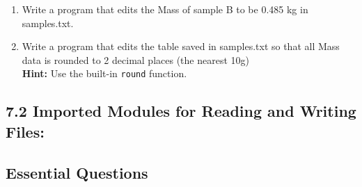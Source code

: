 \documentclass[11pt]{report}
\begin{document}
\begin{enumerate}[label=(\Alph*)]


    \item Write a program that edits the Mass of sample B to be 0.485 kg in samples.txt.
    
    \item Write a program that edits the table saved in samples.txt so that all Mass data is rounded to 2 decimal places (the nearest 10g)\\{\bf Hint:} Use the built-in {\tt round} function.
    
    
    

    
    
    

        
    

    
\end{enumerate}

\subsection*{\Large 7.2 Imported Modules for Reading and Writing Files:}

\subsection*{Essential Questions}

\begin{Exercise}[title= Writing csv files]\label{Ex:Writing_csv}

\ExeText{}

	
	
	

\end{Exercise}
\end{document}
